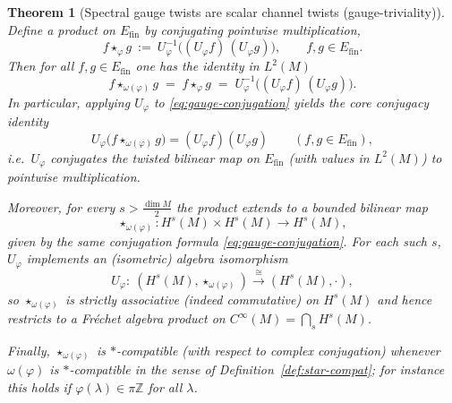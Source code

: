 \documentclass[11pt]{amsart}
\theoremstyle{plain}
\newtheorem{theorem}{Theorem}[section]
\theoremstyle{definition}
\theoremstyle{remark}
\newcommand{\bbZ}{\mathbb{Z}}
\begin{document}
\begin{theorem}[Spectral gauge twists are scalar channel twists (gauge-triviality)]\label{thm:gauge-trivial}
Define a product on $E_{\mathrm{fin}}$ by conjugating pointwise multiplication,
\[
f\star_\varphi g \ :=\ U_\varphi^{-1}\big((U_\varphi f)\,(U_\varphi g)\big),
\qquad f,g\in E_{\mathrm{fin}}.
\]
Then for all $f,g\in E_{\mathrm{fin}}$ one has the identity in $L^2(M)$
\begin{equation}\label{eq:gauge-conjugation}
f\star_{\omega(\varphi)} g \;=\; f\star_\varphi g \;=\; U_\varphi^{-1}\big((U_\varphi f)\,(U_\varphi g)\big).
\end{equation}
In particular, applying $U_\varphi$ to \eqref{eq:gauge-conjugation} yields the core conjugacy identity
\[
U_\varphi\big(f\star_{\omega(\varphi)} g\big)=(U_\varphi f)(U_\varphi g)
\qquad (f,g\in E_{\mathrm{fin}}),
\]
i.e.\ $U_\varphi$ conjugates the twisted bilinear map on $E_{\mathrm{fin}}$ (with values in $L^2(M)$)
to pointwise multiplication.

Moreover, for every $s>\frac{\dim M}{2}$ the product extends to a bounded bilinear map
\[
\star_{\omega(\varphi)}:H^s(M)\times H^s(M)\to H^s(M),
\]
given by the same conjugation formula \eqref{eq:gauge-conjugation}.
For each such $s$, $U_\varphi$ implements an (isometric) algebra isomorphism
\[
U_\varphi:\ (H^s(M),\star_{\omega(\varphi)})\xrightarrow{\ \cong\ }(H^s(M),\cdot),
\]
so $\star_{\omega(\varphi)}$ is strictly associative (indeed commutative) on $H^s(M)$ and hence restricts
to a Fr\'echet algebra product on $C^\infty(M)=\bigcap_s H^s(M)$.

Finally, $\star_{\omega(\varphi)}$ is $*$-compatible (with respect to complex conjugation) whenever $\omega(\varphi)$ is
$*$-compatible in the sense of Definition~\ref{def:star-compat}; for instance this holds if $\varphi(\lambda)\in\pi\bbZ$
for all $\lambda$.
\end{theorem}
\end{document}
